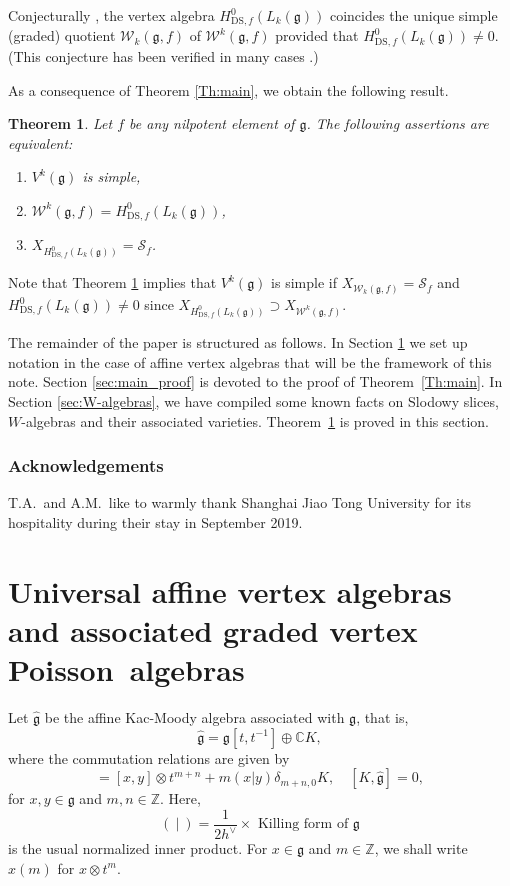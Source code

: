 \documentclass[11pt]{article}
\numberwithin{equation}{section}
\let\oldvee\vee
\renewcommand{\vee}{{\scriptscriptstyle\oldvee}}
\newcommand{\DS}{\mathrm{DS}}
\newcommand\C{{\mathbb C}}
\newcommand\Z{{\mathbb Z}}
\newcommand \g{\mathfrak g}
\newcommand \frg{\widehat{\mathfrak{g}}}
\newcommand \W{\mathscr{W}}
\newtheorem{theorem}{Theorem}[section]
\theoremstyle{definition}
\begin{document}
Conjecturally \cite{KacRoaWak03,KacWak08},
the vertex algebra
$H^{0}_{\DS,f}(L_k(\g))$ coincides
the unique simple (graded) quotient $\W_k(\g,f)$
of $\W^k(\g,f)$
provided that
\hbox{$H^{0}_{\DS,f}(L_k(\g))\ne 0$.}
(This conjecture has been verified in many cases \cite{Ara05,Ara07,Ara08-a,AEkeren19}.)

As a consequence of Theorem \ref{Th:main}, we obtain the following
result.

\begin{theorem}\label{Th:main2}
Let $f$ be any nilpotent element of $\g$.
The following assertions are equivalent:
\begin{enumerate}
\item\label{Th:main21} $V^k(\g)$ is simple,
\item\label{Th:main22} $\W^k(\g,f)=H^{0}_{\DS,f}(L_k(\g))$,
\item\label{Th:main23} $X_{H^{0}_{\DS,f}(L_k(\g))} = \mathscr{S}_f$.
\end{enumerate}
\end{theorem}

Note that Theorem \ref{Th:main2} implies that
$V^k(\g)$ is simple
if
$X_{\W_k(\g,f)}=\mathscr{S}_f$
and $H^{0}_{\DS,f}(L_k(\g))\ne 0$
since
$ X_{H_{\DS,f}^0(L_k(\g))}\supset X_{\W^k(\g,f)}$.

The remainder of the paper is structured as follows.
In Section \ref{sec:affine_vertex_algebras} we set up notation
in the case of affine vertex algebras that will be the framework of this note.
Section \ref{sec:main_proof} is devoted to the proof of Theorem~\ref{Th:main}.
In Section \ref{sec:W-algebras}, we have compiled some known facts
on Slodowy slices, $W$-algebras and their associated varieties.
Theorem~\ref{Th:main2} is proved in this section.

\subsubsection*{Acknowledgements}
T.A.~and A.M.~like to warmly thank Shanghai Jiao Tong University
for its hospitality during their stay in September 2019.

\section{Universal affine vertex algebras and associated
graded vertex \texorpdfstring{Poisson~algebras}{Poisson algebras}}
\label{sec:affine_vertex_algebras}
Let
$\frg$ be the affine Kac-Moody algebra associated with $\g$, that is,
\begin{equation*}
\frg =\g [t,t^{-1}]\oplus \C K,
\end{equation*}
where the commutation relations are given by
\begin{equation*}
[x\otimes t^m,y\otimes t^n]=[x,y]\otimes t^{m+n}+m(x|y)\delta_{m+n,0}K,\quad
[K,\frg]=0,
\end{equation*}
for $x,y\in \g$ and $m,n\in \Z$.
Here,
\[
(~|~)=\displaystyle{\frac{1}{2h^\vee}\times} \text{ Killing form of }\g
\]
is the usual normalized inner product.
For $x \in \g$ and $m \in \Z$, we shall write $x(m)$ for $x
\otimes t^m$.
\end{document}
